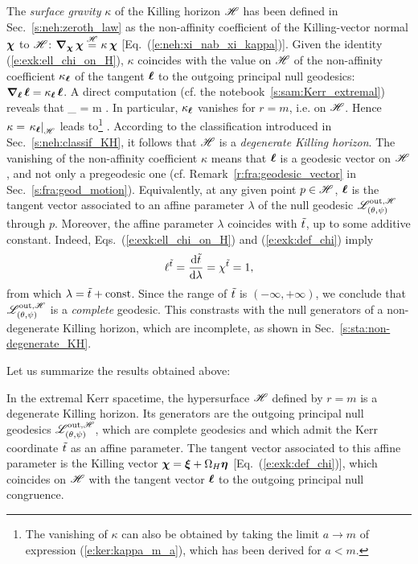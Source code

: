 The \emph{surface gravity} $\kappa$ of the Killing horizon $\mathscr{H}$
has been defined in Sec.~\ref{s:neh:zeroth_law} as the non-affinity coefficient of the Killing-vector normal $\bm{\chi}$ to $\mathscr{H}$:
$\bm{\nabla}_{\bm{\chi}}\, \bm{\chi} \stackrel{\mathscr{H}}{=} \kappa \, \bm{\chi}$ [Eq.~(\ref{e:neh:xi_nab_xi_kappa})].
Given the identity (\ref{e:exk:ell_chi_on_H}), $\kappa$ coincides with the value on $\mathscr{H}$ of the
non-affinity coefficient $\kappa_{\bm{\ell}}$ of the tangent $\bm{\ell}$ to the outgoing principal null
geodesics: $\bm{\nabla}_{\bm{\ell}}\, \bm{\ell} = \kappa_{\bm{\ell}}\, \bm{\ell}$. A direct computation (cf. the notebook~\ref{s:sam:Kerr_extremal}) reveals that
\be
    \kappa_{\wl} = m  .
\ee
In particular, $\kappa_{\bm{\ell}}$ vanishes for $r=m$, i.e. on $\mathscr{H}$.
Hence $\kappa = \left. \kappa_{\bm{\ell}} \right| _{\mathscr{H}}$ leads to\footnote{The vanishing of $\kappa$ can also be obtained
by taking the limit $a\to m$ of expression (\ref{e:ker:kappa_m_a}), which has been derived for $a<m$.}
\be
     .
\ee
According to the classification introduced in Sec.~\ref{s:neh:classif_KH}, it follows
that $\mathscr{H}$ is a \emph{degenerate Killing horizon}.
The vanishing of the non-affinity coefficient $\kappa$ means that $\bm{\ell}$ is a geodesic vector
on $\mathscr{H}$, and not only a pregeodesic  one (cf. Remark~\ref{r:fra:geodesic_vector} in Sec.~\ref{s:fra:geod_motion}). Equivalently, at any given point $p\in\mathscr{H}$,
$\bm{\ell}$ is the tangent vector associated to
an affine parameter $\lambda$ of the null geodesic $\mathscr{L}^{{\rm out},\mathscr{H}}_{(\theta,\psi)}$ through $p$.
Moreover, the affine parameter $\lambda$ coincides with ${\tilde t}$,
up to some additive constant. Indeed,
Eqs.~(\ref{e:exk:ell_chi_on_H}) and (\ref{e:exk:def_chi}) imply
\[
     \ell^{{\tilde t}} = \frac{\mathrm{d} {\tilde t}}{\mathrm{d} \lambda} = \chi^{{\tilde t}} = 1 ,
\]
from which $\lambda = {\tilde t} + \mathrm{const}$.
Since the range of ${\tilde t}$ is $(-\infty, +\infty)$, we conclude that
$\mathscr{L}^{{\rm out},\mathscr{H}}_{(\theta,\psi)}$ is a \emph{complete} geodesic. This constrasts
with the null generators of a non-degenerate Killing horizon, which are
incomplete, as shown in Sec.~\ref{s:sta:non-degenerate_KH}.

Let us summarize the results obtained above:
\begin{prop}
In the extremal Kerr spacetime, the hypersurface $\mathscr{H}$ defined
by $r=m$ is a degenerate Killing horizon.
Its generators are the outgoing principal null geodesics
$\mathscr{L}^{{\rm out},\mathscr{H}}_{(\theta,\psi)}$, which are complete geodesics
and which admit the Kerr coordinate
${\tilde t}$ as an affine parameter. The tangent vector associated to this affine
parameter is the Killing vector $\bm{\chi} = \bm{\xi} + \Omega_H \bm{\eta}$
[Eq.~(\ref{e:exk:def_chi})], which coincides on $\mathscr{H}$ with the tangent
vector $\bm{\ell}$ to the outgoing principal null congruence.
\end{prop}

